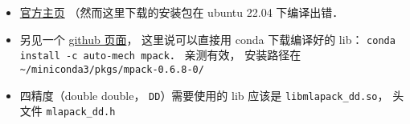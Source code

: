 
\begin{issues}
\issueDraft
\end{issues}

\begin{itemize}
\item \href{https://mplapack.sourceforge.net/}{官方主页} （然而这里下载的安装包在 ubuntu 22.04 下编译出错．
\item 另见一个 \href{https://github.com/Auto-Mech/MPACK}{github 页面}， 这里说可以直接用 conda 下载编译好的 lib： \verb|conda install -c auto-mech mpack|． 亲测有效， 安装路径在 \verb|~/miniconda3/pkgs/mpack-0.6.8-0/|
\item 四精度（double double， \verb|DD|）需要使用的 lib 应该是 \verb|libmlapack_dd.so|， 头文件 \verb|mlapack_dd.h|
\end{itemize}
